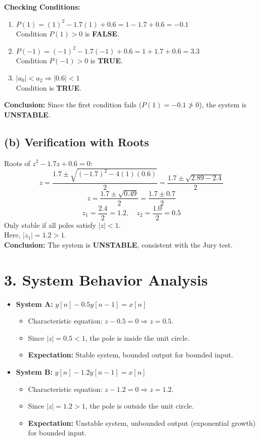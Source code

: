 \documentclass[11pt, a4paper]{article}
\begin{document}
\textbf{Checking Conditions:}
\begin{enumerate}
    \item $P(1) = (1)^2 - 1.7(1) + 0.6 = 1 - 1.7 + 0.6 = -0.1$ \\
    Condition $P(1) > 0$ is \textbf{FALSE}.
    \item $P(-1) = (-1)^2 - 1.7(-1) + 0.6 = 1 + 1.7 + 0.6 = 3.3$ \\
    Condition $P(-1) > 0$ is \textbf{TRUE}.
    \item $|a_0| < a_2 \Rightarrow |0.6| < 1$ \\
    Condition is \textbf{TRUE}.
\end{enumerate}

\textbf{Conclusion:} Since the first condition fails ($P(1) = -0.1 \ngtr 0$), the system is \textbf{UNSTABLE}.

\subsection{(b) Verification with Roots}
Roots of $z^2 - 1.7z + 0.6 = 0$:
$$ z = \frac{1.7 \pm \sqrt{(-1.7)^2 - 4(1)(0.6)}}{2} = \frac{1.7 \pm \sqrt{2.89 - 2.4}}{2} $$
$$ z = \frac{1.7 \pm \sqrt{0.49}}{2} = \frac{1.7 \pm 0.7}{2} $$
$$ z_1 = \frac{2.4}{2} = 1.2, \quad z_2 = \frac{1.0}{2} = 0.5 $$
Only stable if all poles satisfy $|z| < 1$. \\
Here, $|z_1| = 1.2 > 1$. \\
\textbf{Conclusion:} The system is \textbf{UNSTABLE}, consistent with the Jury test.

\section{3. System Behavior Analysis}
\begin{itemize}
    \item \textbf{System A:} $y[n] - 0.5y[n-1] = x[n]$
    \begin{itemize}
        \item Characteristic equation: $z - 0.5 = 0 \Rightarrow z = 0.5$.
        \item Since $|z| = 0.5 < 1$, the pole is inside the unit circle.
        \item \textbf{Expectation:} Stable system, bounded output for bounded input.
    \end{itemize}
    \item \textbf{System B:} $y[n] - 1.2y[n-1] = x[n]$
    \begin{itemize}
        \item Characteristic equation: $z - 1.2 = 0 \Rightarrow z = 1.2$.
        \item Since $|z| = 1.2 > 1$, the pole is outside the unit circle.
        \item \textbf{Expectation:} Unstable system, unbounded output (exponential growth) for bounded input.
    \end{itemize}
\end{itemize}
\end{document}
